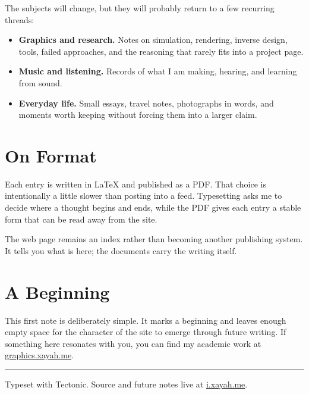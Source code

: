 \documentclass[11pt,a4paper]{article}
\begin{document}
The subjects will change, but they will probably return to a few recurring
threads:

\begin{itemize}
  \item \textbf{Graphics and research.} Notes on simulation, rendering,
    inverse design, tools, failed approaches, and the reasoning that rarely
    fits into a project page.
  \item \textbf{Music and listening.} Records of what I am making, hearing,
    and learning from sound.
  \item \textbf{Everyday life.} Small essays, travel notes, photographs in
    words, and moments worth keeping without forcing them into a larger claim.
\end{itemize}

\section{On Format}

Each entry is written in \LaTeX{} and published as a PDF. That choice is
intentionally a little slower than posting into a feed. Typesetting asks me to
decide where a thought begins and ends, while the PDF gives each entry a stable
form that can be read away from the site.

The web page remains an index rather than becoming another publishing system.
It tells you what is here; the documents carry the writing itself.

\section{A Beginning}

This first note is deliberately simple. It marks a beginning and leaves enough
empty space for the character of the site to emerge through future writing. If
something here resonates with you, you can find my academic work at
\href{https://graphics.xayah.me/}{graphics.xayah.me}.

\vfill
{\color{rulecolor}\rule{\textwidth}{0.5pt}\par}
{\small\color{softink}Typeset with Tectonic. Source and future notes live at
\href{https://i.xayah.me/}{i.xayah.me}.\par}
\end{document}
